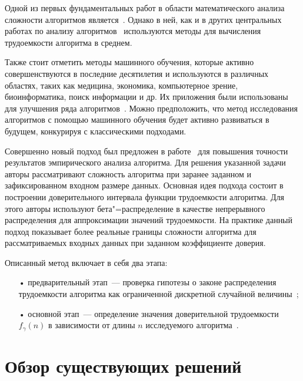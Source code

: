 \documentclass[a4paper, article, 14pt]{extarticle}
\begin{document}
Одной из первых фундаментальных работ в области математического анализа сложности алгоритмов является~\cite{knuth}. Однако в ней, как и в других центральных работах по анализу алгоритмов~\cite{cormen, wegener, juraj} используются методы для вычисления трудоемкости алгоритма в среднем.

Также стоит отметить методы машинного обучения, которые активно совершенствуются в последние десятилетия и используются в различных областях, таких как медицина, экономика, компьютерное зрение, биоинформатика, поиск информации и др. Их приложения были использованы для улучшения ряда алгоритмов~\cite{berube, runtime_prediction, intelligence_forecasting}. Можно предположить, что метод исследования алгоритмов с помощью машинного обучения будет активно развиваться в будущем, конкурируя с классическими подходами.

Совершенно новый подход был предложен в работе~\cite{petrushyn_ulyanov_analysis} для повышения точности результатов эмпирического анализа алгоритма. Для решения указанной задачи авторы рассматривают сложность алгоритма при заранее заданном и зафиксированном входном размере данных. Основная идея подхода состоит в построении доверительного интервала функции трудоемкости алгоритма. Для этого авторы используют бета"=распределение в качестве непрерывного распределения для аппроксимации значений трудоемкости. На практике данный подход показывает более реальные границы сложности алгоритма для рассматриваемых входных данных при заданном коэффициенте доверия.

Описанный метод включает в себя два этапа:

\begin{enumerate}
	\item[•] предварительный этап~--- проверка гипотезы о законе распределения трудоемкости алгоритма как ограниченной дискретной случайной величины~\cite{petrushyn_ulyanov_planning};

	\item[•] основной этап~--- определение значения доверительной трудоемкости $f_\gamma(n)$ в зависимости от длины $n$ исследуемого алгоритма~\cite{petrushyn_ulyanov_analysis}.
\end{enumerate}

\section{Обзор существующих решений}\label{sec:exisiting_solutions_review}
\end{document}
